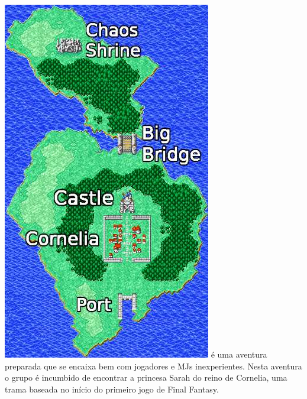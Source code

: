 %
\\\\
%
\includegraphics[width=\columnwidth]{./art/chaosincornelia/map.jpg} \ofpar
%
 é uma aventura preparada que se encaixa bem com jogadores e MJs inexperientes. 
Nesta aventura o grupo é incumbido de encontrar a princesa Sarah do reino de Cornelia, uma trama baseada no início do primeiro jogo de Final Fantasy.
